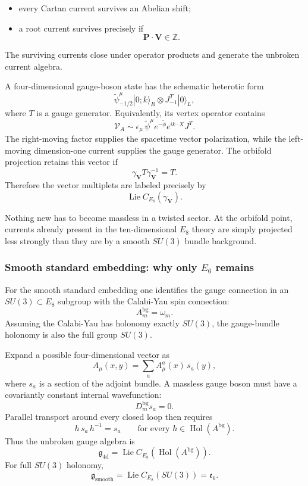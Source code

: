 \documentclass[
  10pt,
  a4paper,
  openany]{book}
\providecommand{\tightlist}{%
  \setlength{\itemsep}{0pt}\setlength{\parskip}{0pt}}
\begin{document}
\begin{itemize}
\tightlist
\item
  every Cartan current survives an Abelian shift;
\item
  a root current survives precisely if \[
  \boxed{
  \mathbf P\cdot\mathbf V\in\mathbb Z
  }.
  \]
\end{itemize}

The surviving currents close under operator products and generate the
unbroken current algebra.

A four-dimensional gauge-boson state has the schematic heterotic form \[
\widetilde\psi_{-1/2}^{\mu}|0;k\rangle_R
\otimes
J_{-1}^{T}|0\rangle_L,
\] where \(T\) is a gauge generator. Equivalently, its vertex operator
contains \[
\mathcal V_A
\sim
\epsilon_\mu\,
\widetilde\psi^\mu
e^{-\widetilde\phi}
e^{ik\cdot X}
J^T.
\] The right-moving factor supplies the spacetime vector polarization,
while the left-moving dimension-one current supplies the gauge
generator. The orbifold projection retains this vector if \[
\gamma_{\mathbf V}T\gamma_{\mathbf V}^{-1}=T.
\] Therefore the vector multiplets are labeled precisely by \[
\operatorname{Lie}C_{E_8}(\gamma_{\mathbf V}).
\]

Nothing new has to become massless in a twisted sector. At the orbifold
point, currents already present in the ten-dimensional \(E_8\) theory
are simply projected less strongly than they are by a smooth \(SU(3)\)
bundle background.

\subsubsection{\texorpdfstring{Smooth standard embedding: why only
\(E_6\)
remains}{Smooth standard embedding: why only E\_6 remains}}\label{smooth-standard-embedding-why-only-e_6-remains}

For the smooth standard embedding one identifies the gauge connection in
an \(SU(3)\subset E_8\) subgroup with the Calabi-Yau spin connection: \[
A_m^{\mathrm{bg}}=\omega_m.
\] Assuming the Calabi-Yau has holonomy exactly \(SU(3)\), the
gauge-bundle holonomy is also the full group \(SU(3)\).

Expand a possible four-dimensional vector as \[
A_\mu(x,y)
=
\sum_a A_\mu^a(x)\,s_a(y),
\] where \(s_a\) is a section of the adjoint bundle. A massless gauge
boson must have a covariantly constant internal wavefunction: \[
D_m^{\mathrm{bg}}s_a=0.
\] Parallel transport around every closed loop then requires \[
h\,s_a\,h^{-1}=s_a
\qquad
\text{for every }
h\in\operatorname{Hol}(A^{\mathrm{bg}}).
\] Thus the unbroken gauge algebra is \[
\mathfrak g_{\mathrm{4d}}
=
\operatorname{Lie}
C_{E_8}\!\left(\operatorname{Hol}(A^{\mathrm{bg}})\right).
\] For full \(SU(3)\) holonomy, \[
\boxed{
\mathfrak g_{\mathrm{smooth}}
=
\operatorname{Lie}C_{E_8}(SU(3))
=
\mathfrak e_6
}.
\]
\end{document}
